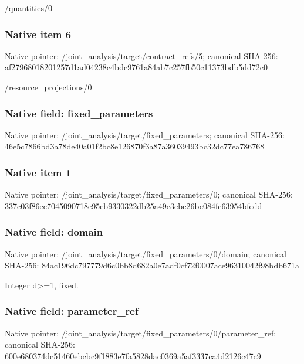 \documentclass[10pt,a4paper]{article}
\begin{document}
\begingroup\raggedright\sloppy /\allowbreak{}quantities/\allowbreak{}0\par\endgroup

\subsubsection{Native item 6}
Native pointer: /joint\_\allowbreak{}analysis/target/contract\_\allowbreak{}refs/5; canonical SHA-256: af27968018201257d1ad04238c4bdc9761a84ab7c257fb50c11373bdb5dd72c0

\begingroup\raggedright\sloppy /\allowbreak{}resource\_\allowbreak{}projections/\allowbreak{}0\par\endgroup

\subsubsection{Native field: fixed\_\allowbreak{}parameters}
Native pointer: /joint\_\allowbreak{}analysis/target/fixed\_\allowbreak{}parameters; canonical SHA-256: 46e5c7866bd3a78de40a01f2bc8e126870f3a87a36039493bc32dc77ea786768

\subsubsection{Native item 1}
Native pointer: /joint\_\allowbreak{}analysis/target/fixed\_\allowbreak{}parameters/0; canonical SHA-256: 337c03f86ec7045090718e95eb9330322db25a49e3cbe26bc084fc63954bfedd

\subsubsection{Native field: domain}
Native pointer: /joint\_\allowbreak{}analysis/target/fixed\_\allowbreak{}parameters/0/domain; canonical SHA-256: 84ac196dc797779d6c0bb8d682a0e7adf0cf72f0007ace96310042f98bdb671a

\begingroup\raggedright\sloppy Integer d>=\allowbreak{}1,\allowbreak{} fixed.\par\endgroup

\subsubsection{Native field: parameter\_\allowbreak{}ref}
Native pointer: /joint\_\allowbreak{}analysis/target/fixed\_\allowbreak{}parameters/0/parameter\_\allowbreak{}ref; canonical SHA-256: 600e680374dc51460ebcbc9f1883e7fa5828dac0369a5af3337ca4d2126c47c9
\end{document}
